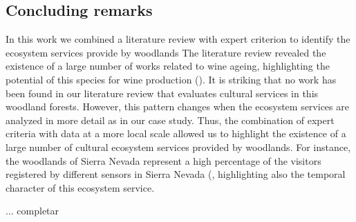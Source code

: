 \subsection{Concluding remarks}\label{sec:es:concluding} 
In this work we combined a literature review with expert criterion to identify the ecosystem services provide by \Qp woodlands The literature review revealed the existence of a large number of works related to wine ageing, highlighting the potential of this species for wine production (). It is striking that no work has been found in our literature review that evaluates cultural services in this woodland forests. However, this pattern changes when the ecosystem services are analyzed in more detail as in our case study. Thus, the combination of expert criteria with data at a more local scale allowed us to highlight the existence of a large number of cultural ecosystem services provided by \Qp woodlands. For instance, the \Qp woodlands of Sierra Nevada represent a high percentage of the visitors registered by different sensors in Sierra Nevada (, highlighting also the temporal character of this ecosystem service. 

... completar 






